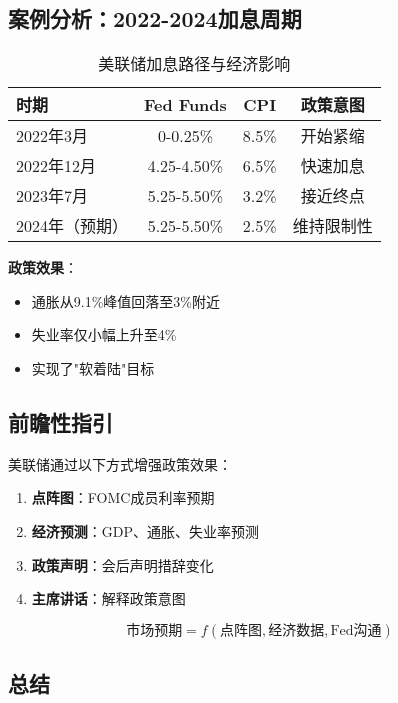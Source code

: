 \subsection{案例分析：2022-2024加息周期}

\begin{table}[h]
\centering
\caption{美联储加息路径与经济影响}
\begin{tabular}{|l|c|c|c|}
\hline
\textbf{时期} & \textbf{Fed Funds} & \textbf{CPI} & \textbf{政策意图} \\
\hline
2022年3月 & 0-0.25\% & 8.5\% & 开始紧缩 \\
2022年12月 & 4.25-4.50\% & 6.5\% & 快速加息 \\
2023年7月 & 5.25-5.50\% & 3.2\% & 接近终点 \\
2024年（预期） & 5.25-5.50\% & 2.5\% & 维持限制性 \\
\hline
\end{tabular}
\end{table}

\textbf{政策效果}：
\begin{itemize}
    \item 通胀从9.1\%峰值回落至3\%附近
    \item 失业率仅小幅上升至4\%
    \item 实现了"软着陆"目标
\end{itemize}

\subsection{前瞻性指引}

美联储通过以下方式增强政策效果：

\begin{enumerate}
    \item \textbf{点阵图}：FOMC成员利率预期
    \item \textbf{经济预测}：GDP、通胀、失业率预测
    \item \textbf{政策声明}：会后声明措辞变化
    \item \textbf{主席讲话}：解释政策意图
\end{enumerate}

\begin{equation}
\text{市场预期} = f(\text{点阵图}, \text{经济数据}, \text{Fed沟通})
\end{equation}

\subsection{总结}


